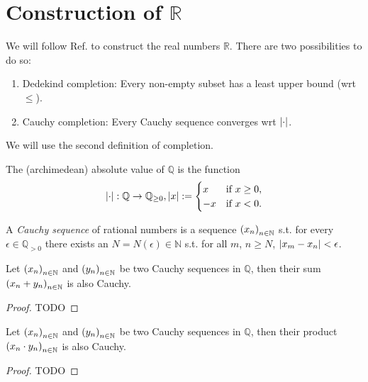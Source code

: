 \section{Construction of $\mathbb R$}\label{app:completion_Q}

We will follow Ref. \cite{src:completion_of_Q} to construct the real numbers $\mathbb R$. There are two possibilities to do so:
\begin{enumerate}
	\item Dedekind completion: Every non-empty subset has a least upper bound (wrt $\leq$).
	\item Cauchy completion: Every Cauchy sequence converges wrt $\abs{\cdot}$.
\end{enumerate}

We will use the second definition of completion.

\begin{defn}
	The (archimedean) absolute value of $\mathbb Q$ is the function 
	\begin{align}
		\abs{\cdot}: \mathbb Q\to\mathbb{Q}_{\geq 0}, \abs{x} := \begin{cases}
			x &\text{if}\ x \geq 0,
			\\ -x &\text{if}\ x < 0.
		\end{cases}
	\end{align}
\end{defn}

\begin{defn}
	A \textit{Cauchy sequence} of rational numbers is a sequence $\seq[x_n]$ s.t. for every $\epsilon\in\mathbb{Q}_{> 0}$ there exists an $N = N(\epsilon)\in\mathbb N$ s.t. for all $m$, $n\geq N$, $\abs{x_m - x_n} < \epsilon$.
\end{defn}

\begin{theorem}\label{thrm:sum_Cauchy_sequences_Cauchy}
	Let $\seq[x_n]$ and $\seq[y_n]$ be two Cauchy sequences in $\mathbb Q$, then their sum $\seq[x_n + y_n]$ is also Cauchy.
\end{theorem}

\begin{proof}
	\Huge\color{red}TODO\color{black}\normalsize
\end{proof}

\begin{theorem}\label{thrm:prod_Cauchy_sequences_Cauchy}
	Let $\seq[x_n]$ and $\seq[y_n]$ be two Cauchy sequences in $\mathbb Q$, then their product $\seq[x_n \cdot y_n]$ is also Cauchy.
\end{theorem}

\begin{proof}
	\Huge\color{red}TODO\color{black}\normalsize
\end{proof}